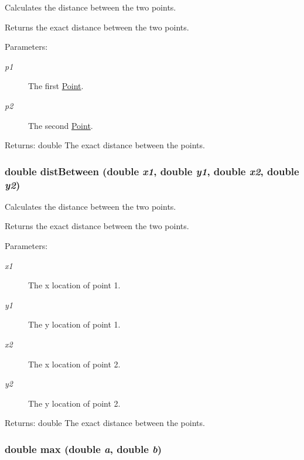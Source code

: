 Calculates the distance between the two points. 

Returns the exact distance between the two points. \begin{Desc}
\item[Parameters:]
\begin{description}
\item[{\em p1}]The first \hyperlink{class_point}{Point}. \item[{\em p2}]The second \hyperlink{class_point}{Point}. \end{description}
\end{Desc}
\begin{Desc}
\item[Returns:]double The exact distance between the points. \end{Desc}
\hypertarget{group__userclasses_ge6b2f472cd9165b5d8b07d31fd3c9fbb}{
\subsubsection[{distBetween}]{\setlength{\rightskip}{0pt plus 5cm}double distBetween (double {\em x1}, \/  double {\em y1}, \/  double {\em x2}, \/  double {\em y2})}}
\label{group__userclasses_ge6b2f472cd9165b5d8b07d31fd3c9fbb}


Calculates the distance between the two points. 

Returns the exact distance between the two points. \begin{Desc}
\item[Parameters:]
\begin{description}
\item[{\em x1}]The x location of point 1. \item[{\em y1}]The y location of point 1. \item[{\em x2}]The x location of point 2. \item[{\em y2}]The y location of point 2. \end{description}
\end{Desc}
\begin{Desc}
\item[Returns:]double The exact distance between the points. \end{Desc}
\hypertarget{group__userclasses_g452d2724d2f82cc2c17f54b388232200}{
\subsubsection[{max}]{\setlength{\rightskip}{0pt plus 5cm}double max (double {\em a}, \/  double {\em b})}}
\label{group__userclasses_g452d2724d2f82cc2c17f54b388232200}


